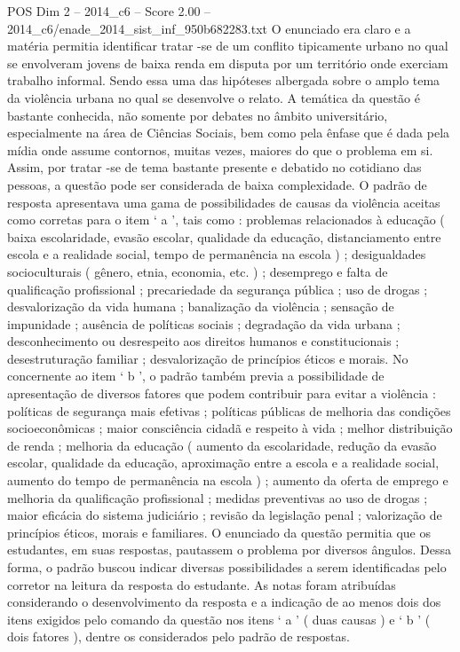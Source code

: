 \begin{textsample}{POS Dim 2 – 2014\_c6 – Score 2.00 – 2014\_c6/enade\_2014\_sist\_inf\_950b682283.txt}
O enunciado era claro e a matéria permitia identificar tratar -se de um conflito tipicamente urbano no qual se envolveram jovens de baixa renda em disputa por um território onde exerciam trabalho informal.
Sendo essa uma das hipóteses albergada sobre o amplo tema da violência urbana no qual se desenvolve o relato.
A temática da questão é bastante conhecida, não somente por debates no âmbito universitário, especialmente na área de Ciências Sociais, bem como pela ênfase que é dada pela mídia onde assume contornos, muitas vezes, maiores do que o problema em si.
Assim, por tratar -se de tema bastante presente e debatido no cotidiano das pessoas, a questão pode ser considerada de baixa complexidade.
O padrão de resposta apresentava uma gama de possibilidades de causas da violência aceitas como corretas para o item ‘ a ’, tais como : problemas relacionados à educação ( baixa escolaridade, evasão escolar, qualidade da educação, distanciamento entre escola e a realidade social, tempo de permanência na escola ) ; desigualdades socioculturais ( gênero, etnia, economia, etc. ) ; desemprego e falta de qualificação profissional ; precariedade da segurança pública ; uso de drogas ; desvalorização da vida humana ; banalização da violência ; sensação de impunidade ; ausência de políticas sociais ; degradação da vida urbana ; desconhecimento ou desrespeito aos direitos humanos e constitucionais ; desestruturação familiar ; desvalorização de princípios éticos e morais.
No concernente ao item ‘ b ’, o padrão também previa a possibilidade de apresentação de diversos fatores que podem contribuir para evitar a violência : políticas de segurança mais efetivas ; políticas públicas de melhoria das condições socioeconômicas ; maior consciência cidadã e respeito à vida ; melhor distribuição de renda ; melhoria da educação ( aumento da escolaridade, redução da evasão escolar, qualidade da educação, aproximação entre a escola e a realidade social, aumento do tempo de permanência na escola ) ; aumento da oferta de emprego e melhoria da qualificação profissional ; medidas preventivas ao uso de drogas ; maior eficácia do sistema judiciário ; revisão da legislação penal ; valorização de princípios éticos, morais e familiares.
O enunciado da questão permitia que os estudantes, em suas respostas, pautassem o problema por diversos ângulos.
Dessa forma, o padrão buscou indicar diversas possibilidades a serem identificadas pelo corretor na leitura da resposta do estudante.
As notas foram atribuídas considerando o desenvolvimento da resposta e a indicação de ao menos dois dos itens exigidos pelo comando da questão nos itens ‘ a ’ ( duas causas ) e ‘ b ’ ( dois fatores ), dentre os considerados pelo padrão de respostas.

\end{textsample}
